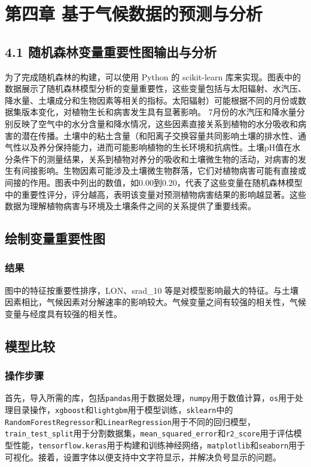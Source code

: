 \documentclass{article}
\begin{document}
	\section{第四章 基于气候数据的预测与分析}
	\subsection{4.1 随机森林变量重要性图输出与分析}
	为了完成随机森林的构建，可以使用 Python 的 scikit-learn 库来实现。图表中的数据展示了随机森林模型分析的变量重要性，这些变量包括与太阳辐射、水汽压、降水量、土壤成分和生物因素等相关的指标。太阳辐射）可能根据不同的月份或数据集版本变化，对植物生长和病害发生具有显著影响。
	7月份的水汽压和降水量分别反映了空气中的水分含量和降水情况，这些因素直接关系到植物的水分吸收和病害的潜在传播。土壤中的粘土含量（和阳离子交换容量共同影响土壤的排水性、通气性以及养分保持能力，进而可能影响植物的生长环境和抗病性。土壤pH值在水分条件下的测量结果，关系到植物对养分的吸收和土壤微生物的活动，对病害的发生有间接影响。生物因素可能涉及土壤微生物群落，它们对植物病害可能有直接或间接的作用。图表中列出的数值，如0.00到0.20，代表了这些变量在随机森林模型中的重要性评分，评分越高，表明该变量对预测植物病害结果的影响越显著。这些数据为理解植物病害与环境及土壤条件之间的关系提供了重要线索。
	
	\subsection{绘制变量重要性图}
	
	
	\subsubsection{结果}
	图中的特征按重要性排序，LON、srad\_10 等是对模型影响最大的特征。与土壤因素相比，气候因素对分解速率的影响较大。气候变量之间有较强的相关性，气候变量与经度具有较强的相关性。

		
	\subsection{模型比较}

\subsubsection{操作步骤}
首先，导入所需的库，包括\texttt{pandas}用于数据处理，\texttt{numpy}用于数值计算，\texttt{os}用于处理目录操作，\texttt{xgboost}和\texttt{lightgbm}用于模型训练，\texttt{sklearn}中的\texttt{RandomForestRegressor}和\texttt{LinearRegression}用于不同的回归模型，\texttt{train\_test\_split}用于分割数据集，\texttt{mean\_squared\_error}和\texttt{r2\_score}用于评估模型性能，\texttt{tensorflow.keras}用于构建和训练神经网络，\texttt{matplotlib}和\texttt{seaborn}用于可视化。接着，设置字体以便支持中文字符显示，并解决负号显示的问题。
\end{document}
